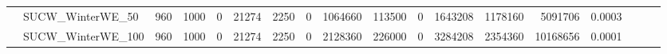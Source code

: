 \begin{landscape}
\begin{longtable}[c]{llrrrrrrrrrrrrrlll}
		& SUCW\_WinterWE\_50           & 960                         & 1000                       & 0                          & 21274                       & 2250                       & 0                          & 1064660                    & 113500                    & 0                         & 1643208                    & 1178160                    & 5091706                        & 0.0003                        &                          &                          &                          \\
		& SUCW\_WinterWE\_100          & 960                         & 1000                       & 0                          & 21274                       & 2250                       & 0                          & 2128360                    & 226000                    & 0                         & 3284208                    & 2354360                    & 10168656                       & 0.0001                        &                          &                          &                          \\ \hline
	\end{longtable}
\end{landscape}


